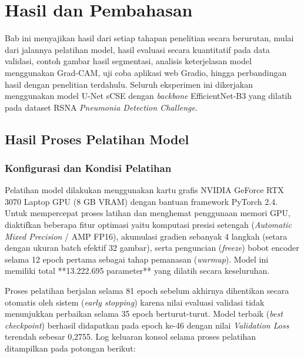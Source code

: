 \documentclass[12pt,a4paper,oneside]{book}
\begin{document}
\pagestyle{body}
\graphicspath{{../img/}{../../doc/img/}{img/}}

\setcounter{chapter}{3}
\chapter[HASIL DAN PEMBAHASAN]{Hasil dan Pembahasan}

Bab ini menyajikan hasil dari setiap tahapan penelitian secara berurutan, mulai dari jalannya pelatihan model, hasil evaluasi secara kuantitatif pada data validasi, contoh gambar hasil segmentasi, analisis keterjelasan model menggunakan Grad-CAM, uji coba aplikasi web Gradio, hingga perbandingan hasil dengan penelitian terdahulu. Seluruh eksperimen ini dikerjakan menggunakan model U-Net sCSE dengan \textit{backbone} EfficientNet-B3 yang dilatih pada dataset RSNA \textit{Pneumonia Detection Challenge}.

\section{Hasil Proses Pelatihan Model}

\subsection{Konfigurasi dan Kondisi Pelatihan}

Pelatihan model dilakukan menggunakan kartu grafis NVIDIA GeForce RTX 3070 Laptop GPU (8 GB VRAM) dengan bantuan framework PyTorch 2.4. Untuk mempercepat proses latihan dan menghemat penggunaan memori GPU, diaktifkan beberapa fitur optimasi yaitu komputasi presisi setengah (\textit{Automatic Mixed Precision} / AMP FP16), akumulasi gradien sebanyak 4 langkah (setara dengan ukuran batch efektif 32 gambar), serta penguncian (\textit{freeze}) bobot encoder selama 12 epoch pertama sebagai tahap pemanasan (\textit{warmup}). Model ini memiliki total **13.222.695 parameter** yang dilatih secara keseluruhan.

Proses pelatihan berjalan selama 81 epoch sebelum akhirnya dihentikan secara otomatis oleh sistem (\textit{early stopping}) karena nilai evaluasi validasi tidak menunjukkan perbaikan selama 35 epoch berturut-turut. Model terbaik (\textit{best checkpoint}) berhasil didapatkan pada epoch ke-46 dengan nilai \textit{Validation Loss} terendah sebesar 0,2755. Log keluaran konsol selama proses pelatihan ditampilkan pada potongan berikut:
\end{document}
